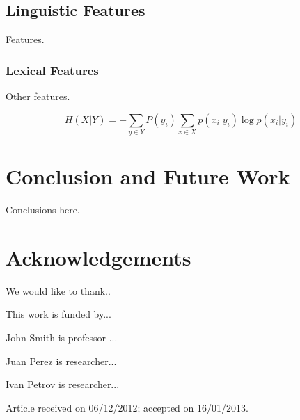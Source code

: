 \documentclass{cys}
\begin{document}
\subsection{Linguistic Features}
\label{subsection:linguistic}

Features. 

\subsubsection{Lexical Features}
\label{subsection:lexicalFeatures}

Other features.

\begin{equation}
H(X|Y) = - \sum_{y \in Y} P(y_i) \sum_{x \in X} p(x_i|y_i)\log p(x_i|y_i)
\label{equation:conditionalEntropy1}
\end{equation}


\section{Conclusion and Future Work}
\label{sec:conclusionAndFutureWork}

Conclusions here.

\section*{Acknowledgements} 
We would like to thank.. 

This work is funded by...


\small{


}
\normalsize


\begin{biography}{John Smith} 
is professor ...
\end{biography}

\begin{biography}{Juan Perez} 
is researcher...
\end{biography}

\begin{biography}{Ivan Petrov} 
is researcher...
\end{biography}


{\vskip 12pt}
\noindent
\footnotesize {Article received on 06/12/2012; accepted on 16/01/2013.}
\end{document}

